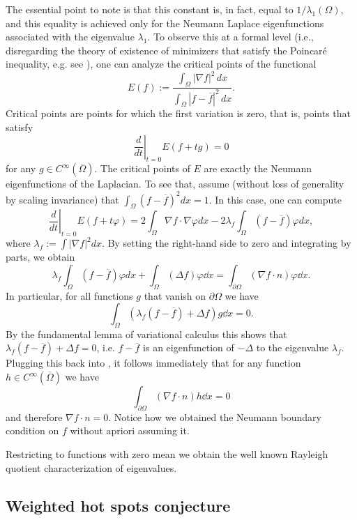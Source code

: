 The essential point to note is that this constant is, in fact, equal to $1/\lambda_1(\Omega)$, and this equality is achieved only for the Neumann Laplace eigenfunctions associated with the eigenvalue $\lambda_1$. To observe this at a formal level (i.e., disregarding the theory of existence of minimizers that satisfy the Poincaré inequality, e.g. see \cite{evans_partial_1998}), one can analyze the critical points of the functional
$$
E(f):=\frac{\int_{\Omega} |\nabla f|^2 \, dx}{\int_{\Omega}|f-\overline f|^2 \, dx}.
$$
Critical points are points for which the first variation is zero, that is, points that satisfy
$$
\left.\frac{d}{dt}\right|_{t=0} E(f+tg) = 0
$$
for any $g\in C^{\infty}(\overline \Omega)$. The critical points of $E$ are exactly the Neumann eigenfunctions of the Laplacian. To see that, assume (without loss of generality by scaling invariance) that $\int_{\Omega} (f - \overline f)^2 dx =1$. In this case, one can compute
$$
\left. \frac{d}{dt} \right|_{t=0}E(f+t\varphi)
=
2\int_{\Omega} \nabla f \cdot \nabla \varphi dx
-2 \lambda_f
\int_{\Omega} (f-\overline f) \varphi dx,
$$
where $\lambda_{f}:= \int |\nabla f|^2 dx$. By setting the right-hand side to zero and integrating by parts, we obtain
\begin{equation} \label{eq:poincare_int_by_parts}
\lambda_f\int_{\Omega} (f-\overline f) \varphi dx
+ \int_\Omega (\Delta f) \varphi \dd{x} = \int_{\partial \Omega} (\nabla f \cdot n) \varphi \dd{x}.
\end{equation}
In particular, for all functions $g$ that vanish on $\partial \Omega$ we have
$$
\int_{\Omega} (\lambda_f(f-\overline f) + \Delta f) g \dd{x} = 0.
$$
By the fundamental lemma of variational calculus this shows that $\lambda_f(f-\overline f) + \Delta f = 0$, i.e. $f-\overline f$ is an eigenfunction of $-\Delta$ to the eigenvalue $\lambda_f$. Plugging this back into , it follows immediately that for any function $h \in C^\infty(\overline{\Omega})$ we have
$$
\int_{\partial \Omega} (\nabla  f \cdot n) h \dd{x} = 0
$$
and therefore $\nabla f \cdot n = 0$. Notice how we obtained the Neumann boundary condition on $f$ without apriori assuming it.

Restricting to functions with zero mean we obtain the well known Rayleigh quotient characterization of eigenvalues.

\subsection{Weighted hot spots conjecture}

